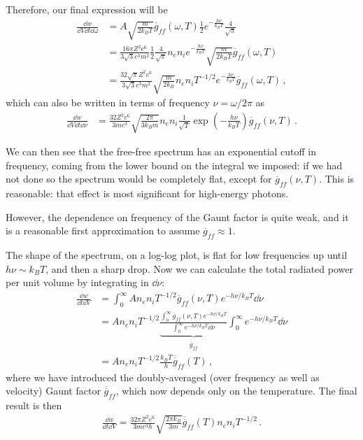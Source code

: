 \documentclass[main.tex]{subfiles}
\begin{document}
Therefore, our final expression will be 
%
\begin{align}
\frac{ \dd{w}}{ \dd{V} \dd{t} \dd{\omega }} 
&= A \sqrt{ \frac{m}{2 k_B T}} \overline{g}_{ff} (\omega , T ) \frac{1}{2} e^{- \frac{h \nu }{k_B T}} \frac{4}{\sqrt{\pi }}  \\
&= \frac{16 \pi Z^2 e^{6}}{3 \sqrt{3} c^3 m^2 } \frac{1}{2} \frac{4}{\sqrt{\pi }} n_e n_i e^{- \frac{h \nu }{k_B T}} \sqrt{ \frac{m}{2 k_B T}} \overline{g}_{ff}(\omega , T)   \\
&= \frac{32 \sqrt{\pi } Z^2 e^{6}}{3 \sqrt{3} c^3 m^2}
\sqrt{ \frac{m}{2 k_B}} n_e n_i T^{-1/2} e^{- \frac{h \nu }{k_B T}} \overline{g}_{ff} (\omega, T)
\,,
\end{align}
%
which can also be written in terms of frequency \(\nu = \omega / 2 \pi \) as  
%
\begin{align}
\frac{ \dd{w}}{ \dd{V} \dd{t} \dd{\nu }}
&= \frac{32 Z^2 e^{6}}{3 m c^3} \sqrt{ \frac{2 \pi }{3 k_B m}} n_e n_i \frac{1}{\sqrt{T}} \exp(- \frac{h \nu }{k_B T}) \overline{g}_{ff}(\nu , T)  
\,.
\end{align}

We can then see that the free-free spectrum has an exponential cutoff in frequency, coming from the lower bound on the integral we imposed: if we had not done so the spectrum would be completely flat, except for \(\overline{g}_{ff}(\nu , T)\).
This is reasonable: that effect is most significant for high-energy photons. 

However, the dependence on frequency of the Gaunt factor is quite weak, and it is a reasonable first approximation to assume \(\overline{g}_{ff} \approx 1\).

The shape of the spectrum, on a log-log plot, is flat for low frequencies up until \(h \nu \sim k_B T\), and then a sharp drop. 
Now we can calculate the total radiated power per unit volume by integrating in \(\dd{\nu }\): 
%
\begin{align}
\frac{ \dd{w}}{ \dd{t} \dd{V}} 
&= \int_{0}^{\infty } A n_e n_i T^{-1/2} \overline{g}_{ff} (\nu, T) e^{-h \nu / k_B T} \dd{\nu }  \\
&= A n_e n_i T^{-1/2} \underbrace{\frac{\int_{0}^{\infty } \overline{g}_{ff} (\nu, T) e^{-h \nu /k_B T}}{\int_0^{\infty} e^{- h \nu / k_B T} \dd{\nu } }}_{\overline{\overline{g}}_{ff}}  
\int_0^{\infty} e^{- h \nu / k_B T} \dd{\nu }
\\
&= A n_e n_i T^{-1/2} \frac{k_B T}{h } \overline{\overline{g}}_{ff}(T)
\,,
\end{align}
%
where we have introduced the doubly-averaged (over frequency as well as velocity) Gaunt factor \(\overline{\overline{g}}_{ff}\), which now depends only on the temperature. The final result is then 
%
\begin{align}
\frac{ \dd{w}}{ \dd{t} \dd{V}} = \frac{32 \pi Z^2 e^{6}}{3 m c^3h} \sqrt{\frac{2 \pi k_B}{3 m}} \overline{\overline{g}}_{ff}(T)  n_en_i T^{-1/2}
\,.
\end{align}
\end{document}
